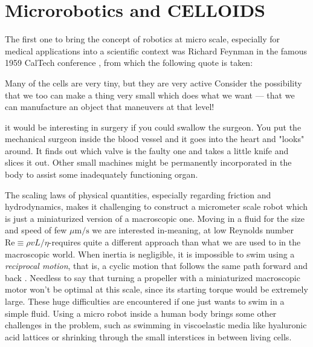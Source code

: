 \documentclass[../../master_thesis_np.tex]{subfiles}
\begin{document}
	
	\section{Microrobotics and CELLOIDS}

	The first one to bring the concept of robotics at micro scale, especially for medical applications into a scientific context was Richard Feynman in the famous 1959 CalTech conference  \cite{Feynman}, from which the following quote is taken:
	\begin{displayquote}
		Many of the cells are very tiny, but they are very active \omissis Consider the possibility that we too can make a thing very small which does what we want — that we can manufacture an object that maneuvers at that level!
		
		\omissis it would be interesting in surgery if you could swallow the surgeon. You put the mechanical surgeon inside the blood vessel and it goes into the heart and "looks" around. \omissis It finds out which valve is the faulty one and takes a little knife and slices it out. Other small machines might be permanently incorporated in the body to assist some inadequately functioning organ.
	\end{displayquote}
	The scaling laws of physical quantities, especially regarding friction and hydrodynamics, makes it challenging to construct a micrometer scale robot which is just a miniaturized version of a macroscopic one.
	Moving in a fluid for the size and speed of few $\mu\text{m/s}$ we are interested in-meaning, at low Reynolds number $\mathrm{Re} \equiv \rho v L/\eta$-requires quite a different approach than what we are used to in the macroscopic world.
	When inertia is negligible, it is impossible to swim using a \emph{reciprocal motion}, that is, a cyclic motion that follows the same path forward and back \cite{purcell_life_1977}. 
	Needless to say that turning a propeller with a miniaturized macroscopic motor won't be optimal at this scale, since its starting torque would be extremely large. 
	These huge difficulties are encountered if one just wants to swim in a simple fluid. 
	Using a micro robot inside a human body brings some other challenges in the problem, such as swimming in viscoelastic media like hyaluronic acid lattices or shrinking through the small interstices in between living cells. 
\end{document}
